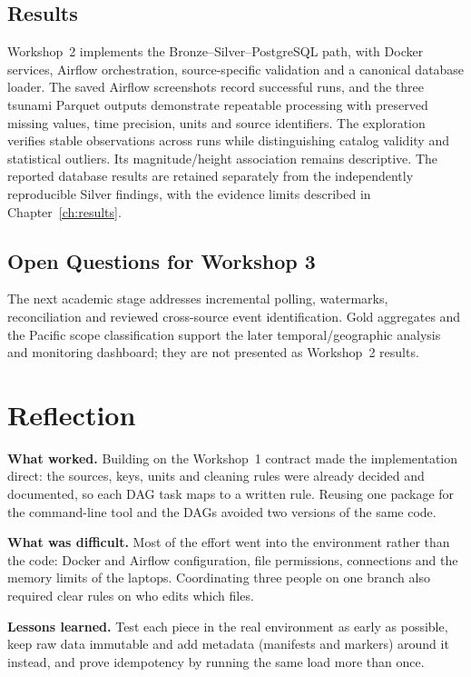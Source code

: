 \documentclass[a4paper,11pt,oneside]{book}
\begin{document}
\section{Results}
Workshop~2 implements the Bronze--Silver--PostgreSQL path, with Docker services, Airflow orchestration, source-specific validation and a canonical database loader. The saved Airflow screenshots record successful runs, and the three tsunami Parquet outputs demonstrate repeatable processing with preserved missing values, time precision, units and source identifiers.
The exploration verifies stable observations across runs while distinguishing catalog validity and statistical outliers. Its magnitude/height association remains descriptive. The reported database results are retained separately from the independently reproducible Silver findings, with the evidence limits described in Chapter~\ref{ch:results}.

\section{Open Questions for Workshop 3}
The next academic stage addresses incremental polling, watermarks, reconciliation and reviewed cross-source event identification. Gold aggregates and the Pacific scope classification support the later temporal/geographic analysis and monitoring dashboard; they are not presented as Workshop~2 results.

\chapter{Reflection}
\label{ch:reflection}
\textbf{What worked.} Building on the Workshop~1 contract made the implementation direct: the sources, keys, units and cleaning rules were already decided and documented, so each DAG task maps to a written rule. Reusing one  package for the command-line tool and the DAGs avoided two versions of the same code.

\textbf{What was difficult.} Most of the effort went into the environment rather than the code: Docker and Airflow configuration, file permissions, connections and the memory limits of the laptops. Coordinating three people on one branch also required clear rules on who edits which files.

\textbf{Lessons learned.} Test each piece in the real environment as early as possible, keep raw data immutable and add metadata (manifests and markers) around it instead, and prove idempotency by running the same load more than once.
\end{document}
